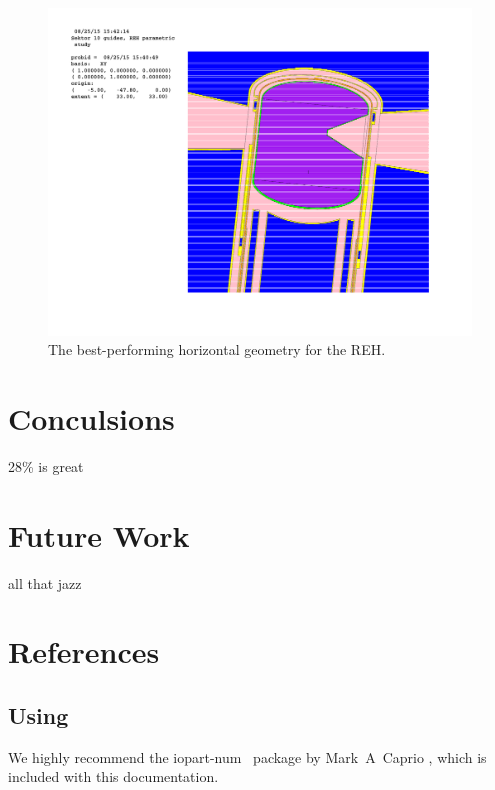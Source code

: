 \documentclass[a4paper]{jpconf}
\begin{document}
\begin{figure}
\begin{center}
\includegraphics[scale=0.6,trim={11.2cm 8cm 5cm 3cm},clip]{graphics/case077.pdf}
\end{center}
\caption{\label{case077}The best-performing horizontal geometry for the REH.}
\end{figure}

\section{Conculsions}

28\% is great



\section{Future Work}

all that jazz



\section{References}

\subsection{Using \BibTeX}
We highly recommend the {\ttfamily\textbf\selectfont iopart-num} \BibTeX\ package by Mark~A~Caprio \cite{iopartnum}, which is included with this documentation.
\end{document}
